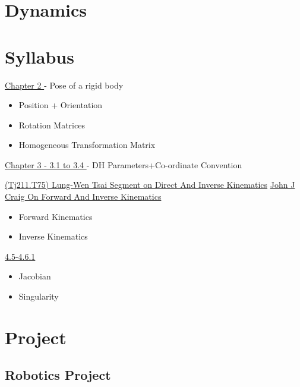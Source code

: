 \documentclass[11pt]{report}
\begin{document}
\part{Dynamics}
\label{sec:org2d9890a}
\part{Syllabus}
\label{sec:org3369a2b}
\href{file:///home/adithya/university-notes/Introduction To Robotics/textbooks/Introduction-to-Robotics-Craig.pdf}{Chapter 2
}- Pose of a rigid body
\begin{itemize}
\item Position + Orientation
\end{itemize}
\begin{itemize}
\item Rotation Matrices
\item Homogeneous Transformation Matrix
\end{itemize}

\href{file:///home/adithya/university-notes/Introduction To Robotics/textbooks/Introduction-to-Robotics-Craig.pdf}{Chapter 3 - 3.1 to 3.4
}- DH Parameters+Co-ordinate Convention

\href{file:///home/adithya/university-notes/Introduction To Robotics/textbooks/(Tj211.T75) Lung-Wen Tsai - Robot Analysis_ The mechanics of serial and parallel manipulators (1999).pdf}{(Tj211.T75) Lung-Wen Tsai Segment on Direct And Inverse Kinematics}
\href{file:///home/adithya/university-notes/Introduction To Robotics/textbooks/Introduction-to-Robotics-Craig.pdf}{John J Craig On Forward And Inverse Kinematics}
\begin{itemize}
\item Forward Kinematics
\item Inverse Kinematics
\end{itemize}

\href{file:///home/adithya/university-notes/Introduction To Robotics/textbooks/(Tj211.T75) Lung-Wen Tsai - Robot Analysis_ The mechanics of serial and parallel manipulators (1999).pdf}{4.5-4.6.1}
\begin{itemize}
\item Jacobian
\item Singularity
\end{itemize}
\part{Project}
\label{sec:org778c44b}
\chapter{Robotics Project}
\label{sec:org0ca1004}
\end{document}

